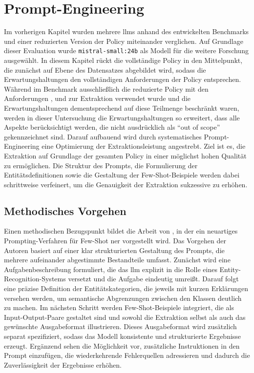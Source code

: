 
\chapter{Prompt-Engineering}\label{ch:prompt-engineering}

Im vorherigen Kapitel wurden mehrere \glspl{llm} anhand des entwickelten Benchmarks und einer reduzierten Version der Policy miteinander verglichen.
Auf Grundlage dieser Evaluation wurde \texttt{mistral-small:24b} als Modell für die weitere Forschung ausgewählt.
In diesem Kapitel rückt die vollständige Policy in den Mittelpunkt, die zunächst auf Ebene des Datensatzes abgebildet wird, sodass die Erwartungshaltungen den vollständigen Anforderungen der Policy entsprechen.
Während im Benchmark ausschließlich die reduzierte Policy mit den Anforderungen ,  und  zur Extraktion verwendet wurde und die Erwartungshaltungen dementsprechend auf diese Teilmenge beschränkt waren, werden in dieser Untersuchung die Erwartungshaltungen so erweitert, dass alle Aspekte berücksichtigt werden, die nicht ausdrücklich als \enquote{out of scope} gekennzeichnet sind.
Darauf aufbauend wird durch systematisches Prompt-Engineering eine Optimierung der Extraktionsleistung angestrebt.
Ziel ist es, die Extraktion auf Grundlage der gesamten Policy in einer möglichst hohen Qualität zu ermöglichen.
Die Struktur des Prompts, die Formulierung der Entitätsdefinitionen sowie die Gestaltung der Few-Shot-Beispiele werden dabei schrittweise verfeinert, um die Genauigkeit der Extraktion sukzessive zu erhöhen.


\section{Methodisches Vorgehen}\label{sec:methodisches-vorgehen}

Einen methodischen Bezugspunkt bildet die Arbeit von \citeauthor{cheng_novel_2024}, in der ein neuartiges Prompting-Verfahren für Few-Shot \gls{ner} vorgestellt wird.
Das Vorgehen der Autoren basiert auf einer klar strukturierten Gestaltung des Prompts, die mehrere aufeinander abgestimmte Bestandteile umfasst.
Zunächst wird eine Aufgabenbeschreibung formuliert, die das \gls{llm} explizit in die Rolle eines Entity-Recognition-Systems versetzt und die Aufgabe eindeutig umreißt.
Darauf folgt eine präzise Definition der Entitätskategorien, die jeweils mit kurzen Erklärungen versehen werden, um semantische Abgrenzungen zwischen den Klassen deutlich zu machen.
Im nächsten Schritt werden Few-Shot-Beispiele integriert, die als Input-Output-Paare gestaltet sind und sowohl die Extraktion selbst als auch das gewünschte Ausgabeformat illustrieren.
Dieses Ausgabeformat wird zusätzlich separat spezifiziert, sodass das Modell konsistente und strukturierte Ergebnisse erzeugt.
Ergänzend sehen \citeauthor{cheng_novel_2024} die Möglichkeit vor, zusätzliche Instruktionen in den Prompt einzufügen, die wiederkehrende Fehlerquellen adressieren und dadurch die Zuverlässigkeit der Ergebnisse erhöhen\autocite{cheng_novel_2024}.

